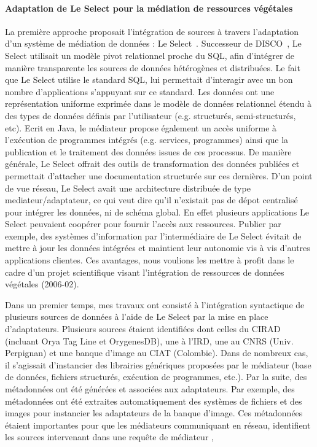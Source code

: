 \paragraph*{Adaptation de Le Select pour la médiation de ressources végétales} La première approche proposait l'intégration de sources à travers l'adaptation d'un système de médiation de données : Le Select~\cite{manolescu2002}. Successeur de DISCO~\cite{Tomasic1998}, Le Select utilisait un modèle pivot relationnel proche du SQL, afin d’intégrer de manière transparente les sources de données hétérogènes et distribuées. Le fait que Le Select utilise le standard SQL, lui permettait d’interagir avec un bon nombre d’applications s’appuyant sur ce standard.
Les données ont une représentation uniforme exprimée dans le modèle de données relationnel étendu à des types de données définis par l'utilisateur (e.g. structurés, semi-structurés, etc). Ecrit en Java, le médiateur propose également un accès uniforme à l’exécution de programmes intégrés (e.g. services, programmes) ainsi que la publication et le traitement des données issues de ces processus. De manière générale, Le Select offrait des outils de transformation des données publiées et permettait d’attacher une documentation structurée sur ces dernières. D’un point de vue réseau, Le Select avait une architecture distribuée de type mediateur/adaptateur, ce qui veut dire qu’il n’existait pas de dépot centralisé pour intégrer les données, ni de schéma global. En effet plusieurs applications Le Select peuvaient coopérer pour fournir l’accès aux ressources. Publier par exemple, des systèmes d’information par l’intermédiaire de Le Select évitait de mettre à jour les données intégrées et maintient leur autonomie vis à vis d’autres applications clientes. Ces avantages, nous voulions les mettre à profit dans le cadre d’un projet scientifique visant l’intégration de ressources de données végétales (2006-02). 

Dans un premier temps, mes travaux ont consisté à l'intégration syntactique de plusieurs sources de données à l'aide de Le Select par la mise en place d'adaptateurs. Plusieurs sources étaient identifiées dont celles du CIRAD (incluant Orya Tag Line et OrygenesDB), une à l'IRD, une au CNRS (Univ. Perpignan) et une banque d'image au CIAT (Colombie). Dans de nombreux cas, il s'agissait d'instancier des librairies génériques proposées par le médiateur (base de données, fichiers structurés, exécution de programmes, etc.). Par la suite, des métadonnées ont été générées et associées aux adaptateurs. Par exemple, des métadonnées ont été extraites automatiquement des systèmes de fichiers et des images pour instancier les adaptateurs de la banque d'image. Ces métadonnées étaient importantes pour que les médiateurs communiquant en réseau, identifient les sources intervenant dans une requête de médiateur ,

